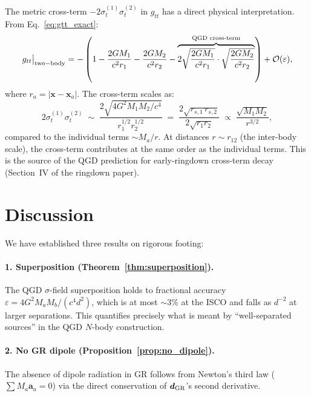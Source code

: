 \documentclass[11pt,a4paper]{article}
\theoremstyle{definition}
\theoremstyle{remark}
\newcommand{\bolda}{\mathbf{a}}
\newcommand{\crossterm}[2]{\sigma_{t}^{(#1)}\sigma_{t}^{(#2)}}
\newcommand{\boldx}{\mathbf{x}}
\begin{document}
	The metric cross-term $-2\crossterm{1}{2}$ in $g_{tt}$ has a direct
	physical interpretation.  From Eq.~\eqref{eq:gtt_exact}:
	\begin{equation}
		g_{tt}\big|_{\rm two-body}
		= -\left(1 - \frac{2GM_1}{c^2 r_1} - \frac{2GM_2}{c^2 r_2}
		- \overbrace{2\sqrt{\frac{2GM_1}{c^2 r_1}}\cdot\sqrt{\frac{2GM_2}{c^2 r_2}}}^{\text{QGD cross-term}}
		\right)
		+ \mathcal{O}(\varepsilon),
		\label{eq:gtt_two_body_explicit}
	\end{equation}
	where $r_a=|\boldx-\boldx_a|$.  The cross-term scales as:
	\begin{equation}
		2\crossterm{1}{2}
		\;\sim\;
		\frac{2\sqrt{4G^2M_1M_2/c^4}}{r_1^{1/2}r_2^{1/2}}
		\;=\;
		\frac{2\sqrt{r_{s,1}\,r_{s,2}}}{2\sqrt{r_1 r_2}}
		\;\propto\;
		\frac{\sqrt{M_1 M_2}}{r^{3/2}},
		\label{eq:cross_scaling}
	\end{equation}
	compared to the individual terms $\sim M_a/r$.  At distances
	$r\sim r_{12}$ (the inter-body scale), the cross-term contributes at
	the same order as the individual terms.  This is the source of the
	QGD prediction for early-ringdown cross-term decay (Section~IV of
	the ringdown paper).
	
	\section{Discussion}
	\label{sec:discussion}
	
	We have established three results on rigorous footing:
	
	\paragraph{1. Superposition (Theorem~\ref{thm:superposition}).}
	The QGD $\sigma$-field superposition holds to fractional accuracy
	$\varepsilon=4G^2M_aM_b/(c^4d^2)$, which is at most $\sim3\%$ at the
	ISCO and falls as $d^{-2}$ at larger separations.  This quantifies
	precisely what is meant by ``well-separated sources'' in the QGD
	$N$-body construction.
	
	\paragraph{2. No GR dipole (Proposition~\ref{prop:no_dipole}).}
	The absence of dipole radiation in GR follows from Newton's third law
	($\sum M_a\bolda_a=0$) via the direct conservation of
	$\boldsymbol{d}_{\rm GR}$'s second derivative.
	
\end{document}
